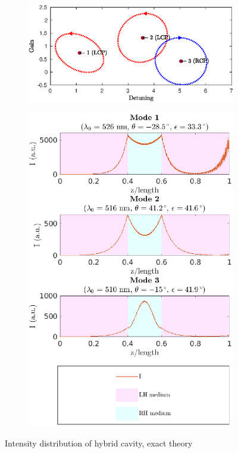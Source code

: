 \begin{figure}
	\centering
	\begin{subfigure}{\linewidth}
		\includegraphics[width=\linewidth]{plots/hybrid/modes_found_oseen}
		\caption{}
	\end{subfigure}
	\begin{subfigure}{\linewidth}
		\includegraphics[width=\linewidth]{plots/hybrid/intensity_distribution_oseen}
		\caption{}
	\end{subfigure}
	\caption[Intensity distribution of hybrid cavity, exact theory]{Intensity distribution of hybrid cavity, exact theory}
	\label{fig:hybrid_intensity_appendix}
\end{figure}

